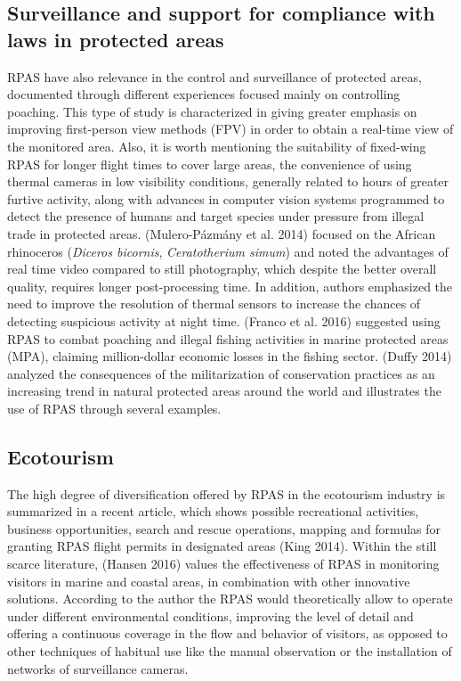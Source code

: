 \documentclass[]{interact}
\theoremstyle{plain}%
\theoremstyle{definition}
\theoremstyle{remark}
\begin{document}
\subsection{Surveillance and support for compliance with laws in
protected
areas}\label{surveillance-and-support-for-compliance-with-laws-in-protected-areas}

RPAS have also relevance in the control and surveillance of protected
areas, documented through different experiences focused mainly on
controlling poaching. This type of study is characterized in giving
greater emphasis on improving first-person view methods (FPV) in order
to obtain a real-time view of the monitored area. Also, it is worth
mentioning the suitability of fixed-wing RPAS for longer flight times to
cover large areas, the convenience of using thermal cameras in low
visibility conditions, generally related to hours of greater furtive
activity, along with advances in computer vision systems programmed to
detect the presence of humans and target species under pressure from
illegal trade in protected areas. (Mulero-Pázmány et al. 2014) focused
on the African rhinoceros (\emph{Diceros bicornis}, \emph{Ceratotherium
simum}) and noted the advantages of real time video compared to still
photography, which despite the better overall quality, requires longer
post-processing time. In addition, authors emphasized the need to
improve the resolution of thermal sensors to increase the chances of
detecting suspicious activity at night time. (Franco et al. 2016)
suggested using RPAS to combat poaching and illegal fishing activities
in marine protected areas (MPA), claiming million-dollar economic losses
in the fishing sector. (Duffy 2014) analyzed the consequences of the
militarization of conservation practices as an increasing trend in
natural protected areas around the world and illustrates the use of RPAS
through several examples.

\subsection{Ecotourism}\label{ecotourism}

The high degree of diversification offered by RPAS in the ecotourism
industry is summarized in a recent article, which shows possible
recreational activities, business opportunities, search and rescue
operations, mapping and formulas for granting RPAS flight permits in
designated areas (King 2014). Within the still scarce literature,
(Hansen 2016) values the effectiveness of RPAS in monitoring visitors in
marine and coastal areas, in combination with other innovative
solutions. According to the author the RPAS would theoretically allow to
operate under different environmental conditions, improving the level of
detail and offering a continuous coverage in the flow and behavior of
visitors, as opposed to other techniques of habitual use like the manual
observation or the installation of networks of surveillance cameras.
\end{document}
